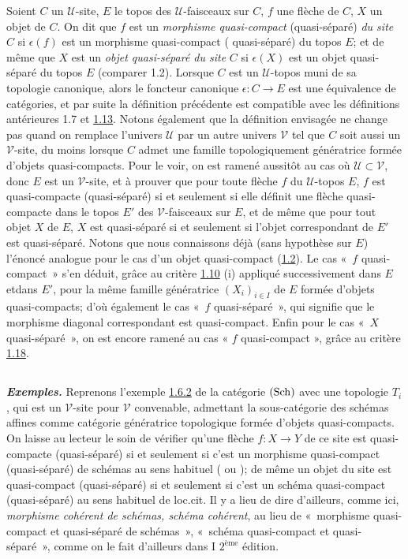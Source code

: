 \documentclass[10pt]{../fichiers-configuration-latex/smfart}
\begin{document}
Soient  $C$ un $𝒰$-site, $E$ le topos des $𝒰$-faisceaux
sur $C$, $f$ une flèche de $C$, $X$ un objet de $C$. On dit que $f$ est
un \emph{morphisme quasi-compact} (\resp quasi-séparé) \emph{du site}
$C$ si $\epsilon(f)$ est un morphisme quasi-compact (\resp
quasi-séparé) du topos $E$; et de même que $X$ est un \emph{objet
  quasi-séparé du site} $C$ si $\epsilon(X)$ est un
objet quasi-séparé du topos $E$ (comparer 1.2). Lorsque $C$ est un
$𝒰$-topos muni de sa topologie canonique, alors le foncteur
canonique $\epsilon : C \to E$ est une équivalence de catégories, et
par suite la définition précédente est compatible avec les
définitions antérieures 1.7 et \hyperref[VI.def1.13]{1.13}. Notons également
que la définition envisagée ne change pas quand on remplace
l'univers $𝒰$ par un autre univers $𝒱$ tel que $C$
soit aussi un $𝒱$-site, du moins lorsque $C$ admet une
famille topologiquement génératrice formée d'objets quasi-compacts.
Pour le voir, on est ramené aussitôt au cas où $𝒰
\subset 𝒱$, donc $E$ est un $𝒱$-site, et à prouver
que pour toute flèche $f$ du $𝒰$-topos $E$, $f$ est
quasi-compacte (\resp quasi-séparé) si et seulement si elle définit
une flèche quasi-compacte dans le topos $E'$ des
$𝒱$-faisceaux sur $E$, et de même que pour tout objet $X$ de
$E$, $X$ est quasi-séparé si et seulement si l'objet correspondant
de $E'$ est quasi-séparé. Notons que nous connaissons déjà (sans
hypothèse sur $E$) l'énoncé analogue pour le cas d'un objet
quasi-compact (\hyperref[VI.prop1.2]{1.2}). Le cas « $f$ quasi-compact »
s'en déduit, grâce au critère \hyperref[VI.prop1.10]{1.10} (i) appliqué
successivement dans $E$ et\pageoriginale dans $E'$, pour la même
famille génératrice $(X_i)_{i \in I}$ de $E$ formée d'objets
quasi-compacts; d'où également le cas « $f$ quasi-séparé »,
qui signifie que le morphisme diagonal correspondant est
quasi-compact. Enfin pour le cas « $X$ quasi-séparé », on est
encore ramené au cas « $f$ quasi-compact », grâce au critère
\hyperref[VI.cor1.18]{1.18}.

\subsection{}
{\textit{\textbf{Exemples.}}} Reprenons l'exemple
\hyperref[VI.subsubsec1.6.2]{1.6.2} de la catégorie $(\operatorname{Sch})$ avec une topologie
$T_i$, qui est un $𝒱$-site pour $𝒱$ convenable,
admettant la sous-catégorie des schémas affines comme catégorie
génératrice topologique formée d'objets quasi-compacts. On laisse au
lecteur le soin de vérifier qu'une flèche $f: X \to Y$ de ce site
est quasi-compacte (\resp quasi-séparé) si et seulement si c'est un
morphisme quasi-compact (\resp quasi-séparé) de schémas au sens
habituel (\cite{SGA4-06:3} ou \cite{SGA4-06:4}); de même un objet du site est
quasi-compact (\resp quasi-séparé) si et seulement si c'est un
schéma quasi-compact (\resp quasi-séparé) au sens habituel de
loc.cit. Il y a lieu de dire d'ailleurs, comme ici, \emph{morphisme
cohérent de schémas, schéma
  cohérent}, au lieu de « morphisme quasi-compact et quasi-séparé de
schémas », « schéma quasi-compact et quasi-séparé », comme on le
fait d'ailleurs dans \EGA I $2^{\text{ème}}$ édition.
\end{document}
